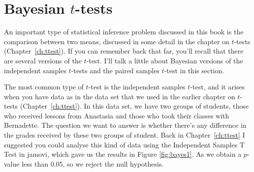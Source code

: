 \begin{comment}
Finally, if we turn to hypergeometric sampling in which everything is fixed, we get...
\begin{rblock1}
> @usr{contingencyTableBF(crosstab, sampleType = "hypergeom")}
Error in contingencyHypergeometric(as.matrix(data2), a) : 
  hypergeometric contingency tables restricted to 2 x 2 tables; see help for contingencyTableBF()
\end{rblock1}
... an error message. Okay, some quick reading through the help files hints that support for larger contingency tables is coming, but it's not been implemented yet. In the meantime, let's imagine we have data from the ``toy labelling'' experiment I described earlier in this section. Specifically, let's say our data look like this:
\begin{rblock1}
> @usr{toys}
     pink blue
girl    8    2
boy     2    8
\end{rblock1}
The Bayesian test with hypergeometric sampling gives us this:
\begin{rblock1}
> @usr{contingencyTableBF(toys, sampleType = "hypergeom")}
Bayes factor analysis
--------------
[1] Non-indep. (a=1) : 8.294321 @plusorminus0%

Against denominator:
  Null, independence, a = 1 
---
Bayes factor type: BFcontingencyTable, hypergeometric
\end{rblock1}
The Bayes factor of 8:1 provides modest evidence that the labels were being assigned in a way that correlates gender with colour, but it's not conclusive.



\end{comment}


\section{Bayesian $t$-tests\label{sec:ttestbf}}

An important type of statistical inference problem discussed in this book is the comparison between two means, discussed in some detail in the chapter on $t$-tests (Chapter~\ref{ch:ttest}). If you can remember back that far, you'll recall that there are several versions of the $t$-test. I'll talk a little about Bayesian versions of the independent samples $t$-tests and the paired samples $t$-test in this section. 


The most common type of $t$-test is the independent samples $t$-test, and it arises when you have data as in the  data set that we used in the earlier chapter on $t$-tests (Chapter~\ref{ch:ttest}). In this data set, we have two groups of students, those who received lessons from Anastasia and those who took their classes with Bernadette. The question we want to answer is whether there's any difference in the grades received by these two groups of student. Back in Chapter~\ref{ch:ttest} I suggested you could analyse this kind of data using the Independent Samples T Test in jamovi, which gave us the results in Figure \ref{fig:bayes1}. As we obtain a $p$-value less than 0.05, so we reject the null hypothesis. 


